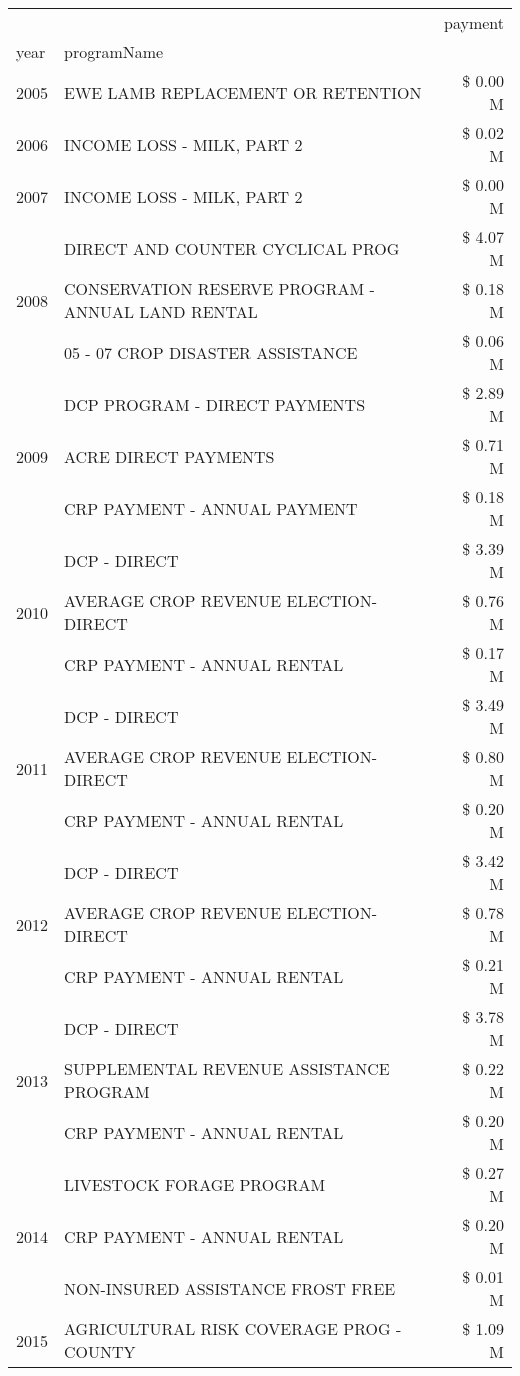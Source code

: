 \begin{tabular}{llr}
\toprule
 &  & payment \\
year & programName &  \\
\midrule
2005 & EWE LAMB REPLACEMENT OR RETENTION & \$ 0.00 M \\
\cline{1-3}
2006 & INCOME LOSS - MILK, PART 2 & \$ 0.02 M \\
\cline{1-3}
2007 & INCOME LOSS - MILK, PART 2 & \$ 0.00 M \\
\cline{1-3}
\multirow[t]{3}{*}{2008} & DIRECT AND COUNTER CYCLICAL PROG & \$ 4.07 M \\
 & CONSERVATION RESERVE PROGRAM - ANNUAL LAND RENTAL & \$ 0.18 M \\
 & 05 - 07 CROP DISASTER ASSISTANCE & \$ 0.06 M \\
\cline{1-3}
\multirow[t]{3}{*}{2009} & DCP PROGRAM - DIRECT PAYMENTS & \$ 2.89 M \\
 & ACRE DIRECT PAYMENTS & \$ 0.71 M \\
 & CRP PAYMENT - ANNUAL PAYMENT & \$ 0.18 M \\
\cline{1-3}
\multirow[t]{3}{*}{2010} & DCP - DIRECT & \$ 3.39 M \\
 & AVERAGE CROP REVENUE ELECTION-DIRECT & \$ 0.76 M \\
 & CRP PAYMENT - ANNUAL RENTAL & \$ 0.17 M \\
\cline{1-3}
\multirow[t]{3}{*}{2011} & DCP - DIRECT & \$ 3.49 M \\
 & AVERAGE CROP REVENUE ELECTION-DIRECT & \$ 0.80 M \\
 & CRP PAYMENT - ANNUAL RENTAL & \$ 0.20 M \\
\cline{1-3}
\multirow[t]{3}{*}{2012} & DCP - DIRECT & \$ 3.42 M \\
 & AVERAGE CROP REVENUE ELECTION-DIRECT & \$ 0.78 M \\
 & CRP PAYMENT - ANNUAL RENTAL & \$ 0.21 M \\
\cline{1-3}
\multirow[t]{3}{*}{2013} & DCP - DIRECT & \$ 3.78 M \\
 & SUPPLEMENTAL REVENUE ASSISTANCE PROGRAM & \$ 0.22 M \\
 & CRP PAYMENT - ANNUAL RENTAL & \$ 0.20 M \\
\cline{1-3}
\multirow[t]{3}{*}{2014} & LIVESTOCK FORAGE PROGRAM & \$ 0.27 M \\
 & CRP PAYMENT - ANNUAL RENTAL & \$ 0.20 M \\
 & NON-INSURED ASSISTANCE FROST FREE & \$ 0.01 M \\
\cline{1-3}
\multirow[t]{3}{*}{2015} & AGRICULTURAL RISK COVERAGE PROG - COUNTY & \$ 1.09 M \\

\end{tabular}
